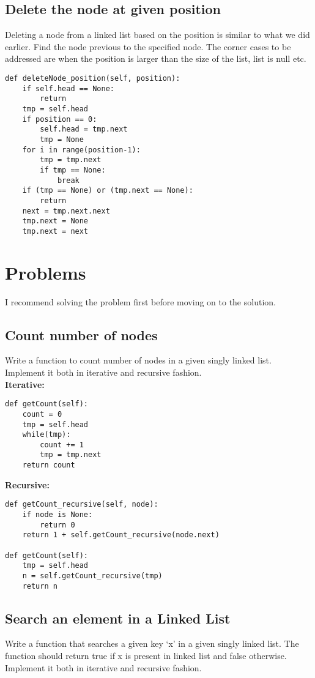\subsection{Delete the node at given position}
Deleting a node from a linked list based on the position is similar to what we did earlier. Find the node previous to the specified node. The corner cases to be addressed are when the position is larger than the size of the list, list is null etc.

\begin{lstlisting}
def deleteNode_position(self, position):
    if self.head == None:
        return
    tmp = self.head
    if position == 0:
        self.head = tmp.next
        tmp = None
    for i in range(position-1):
        tmp = tmp.next
        if tmp == None:
            break
    if (tmp == None) or (tmp.next == None):
        return
    next = tmp.next.next
    tmp.next = None
    tmp.next = next
\end{lstlisting}

\section{Problems}
I recommend solving the problem first before moving on to the solution. 
\subsection{Count number of nodes}
Write a function to count number of nodes in a given singly linked list. Implement it both in iterative and recursive fashion. \\

\noindent \textbf{Iterative:}
\begin{lstlisting}
def getCount(self):
    count = 0
    tmp = self.head
    while(tmp):
        count += 1
        tmp = tmp.next
    return count
\end{lstlisting}

\noindent \textbf{Recursive:}
\begin{lstlisting}
def getCount_recursive(self, node):
    if node is None:
        return 0
    return 1 + self.getCount_recursive(node.next)

def getCount(self):
    tmp = self.head
    n = self.getCount_recursive(tmp)	
    return n
\end{lstlisting}



\subsection{Search an element in a Linked List}
Write a function that searches a given key ‘x’ in a given singly linked list. The function should return true if x is present in linked list and false otherwise. Implement it both in iterative and recursive fashion.

